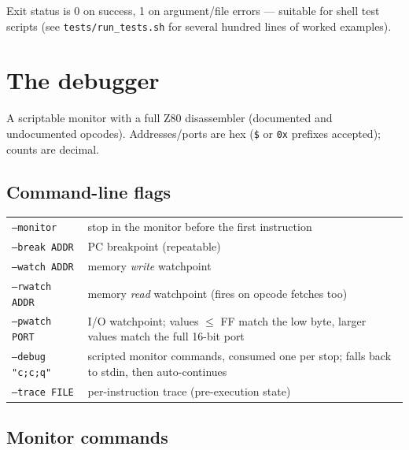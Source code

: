 \documentclass[11pt,a4paper]{article}
\newcommand{\opt}[1]{\texttt{#1}}
\begin{document}
Exit status is 0 on success, 1 on argument/file errors --- suitable
for shell test scripts (see \texttt{tests/run\_tests.sh} for several
hundred lines of worked examples).

\section{The debugger}

A scriptable monitor with a full Z80 disassembler (documented and
undocumented opcodes). Addresses/ports are hex (\texttt{\$} or
\texttt{0x} prefixes accepted); counts are decimal.

\subsection{Command-line flags}

\begin{tabularx}{\textwidth}{lX}
\toprule
\opt{--monitor} & stop in the monitor before the first instruction \\
\opt{--break ADDR} & PC breakpoint (repeatable) \\
\opt{--watch ADDR} & memory \emph{write} watchpoint \\
\opt{--rwatch ADDR} & memory \emph{read} watchpoint (fires on opcode
fetches too) \\
\opt{--pwatch PORT} & I/O watchpoint; values $\le$ FF match the low
byte, larger values match the full 16-bit port \\
\opt{--debug "c;c;q"} & scripted monitor commands, consumed one per
stop; falls back to stdin, then auto-continues \\
\opt{--trace FILE} & per-instruction trace (pre-execution state) \\
\bottomrule
\end{tabularx}

\subsection{Monitor commands}
\end{document}
